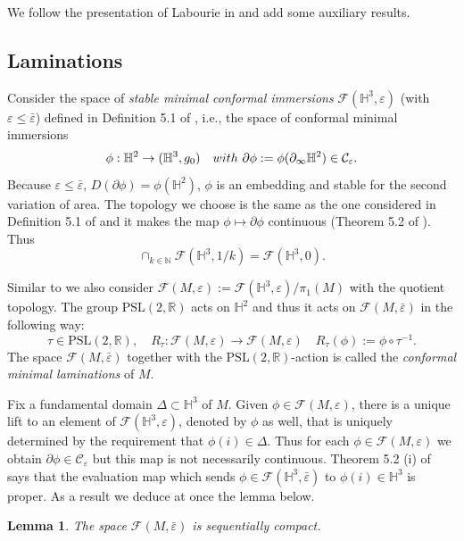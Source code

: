 \documentclass[11pt]{amsart}
\def\R{\mathbb R}
\def\H{\mathbb H}
\def\N{\mathbb N}
\newtheorem{lemm}[thm]{Lemma}
\theoremstyle{remark}
\theoremstyle{definition}
\begin{document}
{{	We follow the presentation of Labourie in \cite{Labourie} and add some auxiliary results.
	\subsection{Laminations}
	Consider the space of {\em stable minimal conformal immersions} $\mathcal F(\H^3,\varepsilon)$ (with $\varepsilon\leq \bar\varepsilon$) defined in Definition 5.1 of \cite{Labourie}, i.e.,  the space of conformal minimal immersions $$\phi:\H^2\rightarrow (\H^3,g_0)\quad{\rm with}\,\, \partial\phi:=\phi(\partial_{\infty}\H^2)\in \mathcal C_{\varepsilon}.$$ Because $\varepsilon\leq \bar \varepsilon$, $D(\partial\phi)=\phi(\H^2)$, $\phi$ is an embedding and stable for the second variation of area. The topology we choose is the same as the one considered in Definition 5.1 of \cite{Labourie} and it makes the map $\phi\mapsto \partial\phi$ continuous (Theorem 5.2 of \cite{Labourie}). Thus $$\cap_{k\in\N}\mathcal F(\H^3,1/k)=\mathcal F(\H^3,0).$$
	
	
	Similar to \cite{Labourie}  we also consider $\mathcal F(M,\varepsilon):=\mathcal F(\H^3,\varepsilon)/ \pi_1(M)$ {with the quotient topology}. The group $\text{PSL}(2,\R)$ acts on $\H^2$ and thus it acts on $\mathcal F(M,\bar\varepsilon)$  in the following way:   
	\begin{equation}\label{action}
		\tau\in  \text{PSL}(2,\R), \quad R_\tau: \mathcal F(M,\varepsilon)\rightarrow  \mathcal F(M,\varepsilon)\quad  R_\tau(\phi):=\phi\circ \tau^{-1}.
	\end{equation}
	The space  $\mathcal F(M,\bar\varepsilon)$ together with the $\text{PSL}(2,\R)$-action is called the {\em conformal minimal laminations} of $M$.
	
	
	Fix a  fundamental domain $\Delta\subset \H^3$ of $M$. Given $\phi\in \mathcal F(M,\varepsilon)$, there is a unique lift to an element of $\mathcal F(\H^3,\varepsilon)$, denoted by $\phi$ as well, that is uniquely determined by the requirement that $\phi(i)\in \Delta$.   Thus for each $\phi \in \mathcal F(M,\varepsilon)$ we obtain $\partial \phi\in \mathcal C_{\varepsilon}$ but this map is not necessarily continuous. Theorem 5.2 (i) of \cite{Labourie} says that the evaluation map which sends $\phi\in \mathcal F(\H^3,\bar \varepsilon)$ to $\phi(i)\in \H^3$ is proper. As a result we deduce at once the lemma below.
	
	\begin{lemm}\label{laminations.compact} The space $\mathcal F(M,\bar \varepsilon)$ is sequentially compact.
	\end{lemm} 
	
}}
\end{document}

